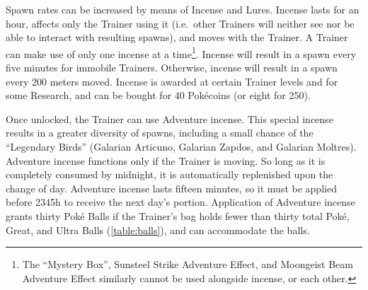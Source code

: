 Spawn rates can be increased by means of Incense and Lures.
Incense lasts for an hour, affects only the Trainer using it (i.e.\ other Trainers
  will neither see nor be able to interact with resulting spawns),
  and moves with the Trainer.
A Trainer can make use of only one incense at a time\footnote{The
  ``Mystery Box'', Sunsteel Strike Adventure Effect, and
  Moongeist Beam Adventure Effect similarly cannot be used
  alongside incense, or each other.}.
Incense will result in a spawn every five minutes for immobile Trainers.
Otherwise, incense will result in a spawn every 200 meters moved.
Incense is awarded at certain Trainer levels and for some Research,
  and can be bought for 40 Pokécoins (or eight for 250).

Once unlocked, the Trainer can use Adventure incense.
This special incense results in a greater diversity of spawns, including
  a small chance of the ``Legendary Birds''
  (Galarian Articuno, Galarian Zapdos, and Galarian Moltres).
Adventure incense functions only if the Trainer is moving.
So long as it is completely consumed by midnight, it is automatically replenished
  upon the change of day.
Adventure incense lasts fifteen minutes, so it must be applied before 2345h
  to receive the next day's portion.
Application of Adventure incense grants thirty Poké Balls if the Trainer's
  bag holds fewer than thirty total Poké, Great, and Ultra Balls (\autoref{table:balls}),
  and can accommodate the balls.

